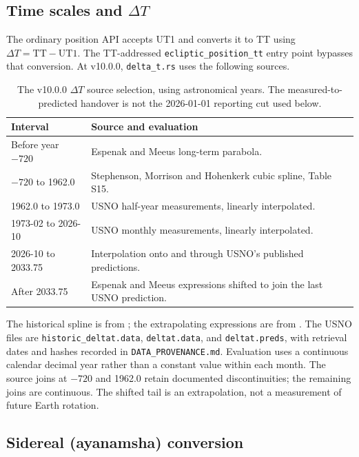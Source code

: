 \documentclass[11pt]{article}
\begin{document}
\subsection{Time scales and $\Delta T$}

The ordinary position API accepts UT1 and converts it to TT using
$\Delta T=\mathrm{TT}-\mathrm{UT1}$. The TT-addressed
\texttt{ecliptic\_position\_tt} entry point bypasses that conversion.
At v10.0.0, \texttt{delta\_t.rs} uses the following sources.

\begin{table}[!htbp]
\centering
\small
\begin{tabular}{@{}p{3.0cm}p{9.8cm}@{}}
\toprule
Interval & Source and evaluation \\
\midrule
Before year $-720$ & Espenak and Meeus long-term parabola. \\
$-720$ to 1962.0 & Stephenson, Morrison and Hohenkerk cubic spline, Table S15. \\
1962.0 to 1973.0 & USNO half-year measurements, linearly interpolated. \\
1973-02 to 2026-10 & USNO monthly measurements, linearly interpolated. \\
2026-10 to 2033.75 & Interpolation onto and through USNO's published predictions. \\
After 2033.75 & Espenak and Meeus expressions shifted to join the last USNO prediction. \\
\bottomrule
\end{tabular}
\caption{The v10.0.0 $\Delta T$ source selection, using astronomical years.
The measured-to-predicted handover is not the 2026-01-01 reporting cut used below.}
\end{table}

The historical spline is from \citet{stephenson2016rotation}; the extrapolating
expressions are from \citet{espenak2006canon}. The USNO files are
\texttt{historic\_deltat.data}, \texttt{deltat.data}, and \texttt{deltat.preds},
with retrieval dates and hashes recorded in \texttt{DATA\_PROVENANCE.md}.
Evaluation uses a continuous calendar decimal year rather than a constant value within
each month. The source joins at $-720$ and 1962.0 retain documented discontinuities;
the remaining joins are continuous. The shifted tail is an extrapolation, not a
measurement of future Earth rotation.

\subsection{Sidereal (ayanamsha) conversion}
\end{document}
